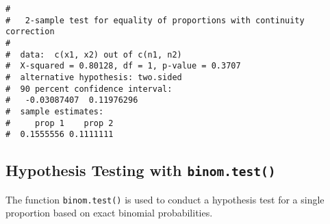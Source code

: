\documentclass[letterpaper,12pt,twoside,]{pinp}
\begin{document}
\begin{Shaded}
\begin{Highlighting}[]
\StringTok{ }\OperatorTok{$}\OperatorTok{==} \OperatorTok{&}\StringTok{ }\OperatorTok{$}\OperatorTok{==}\NormalTok{)}
\StringTok{ }\OperatorTok{$}\OperatorTok{==} \OperatorTok{&}\StringTok{ }\OperatorTok{$}\OperatorTok{==}\NormalTok{)}
\StringTok{ }\OperatorTok{$}\OperatorTok{==}\NormalTok{)}
\StringTok{ }\OperatorTok{$}\OperatorTok{==}\NormalTok{)}

\NormalTok{(}   \NormalTok{, } \NormalTok{)}
\end{Highlighting}
\end{Shaded}

\begin{ShadedResult}
\begin{verbatim}
#  
#   2-sample test for equality of proportions with continuity correction
#  
#  data:  c(x1, x2) out of c(n1, n2)
#  X-squared = 0.80128, df = 1, p-value = 0.3707
#  alternative hypothesis: two.sided
#  90 percent confidence interval:
#   -0.03087407  0.11976296
#  sample estimates:
#     prop 1    prop 2 
#  0.1555556 0.1111111
\end{verbatim}
\end{ShadedResult}

\hypertarget{hypothesis-testing-with-1}{%
\subsection{\texorpdfstring{Hypothesis Testing with
\texttt{binom.test()}}{Hypothesis Testing with }}\label{hypothesis-testing-with-1}}

The function \texttt{binom.test()} is used to conduct a hypothesis test
for a single proportion based on exact binomial probabilities.
\end{document}
